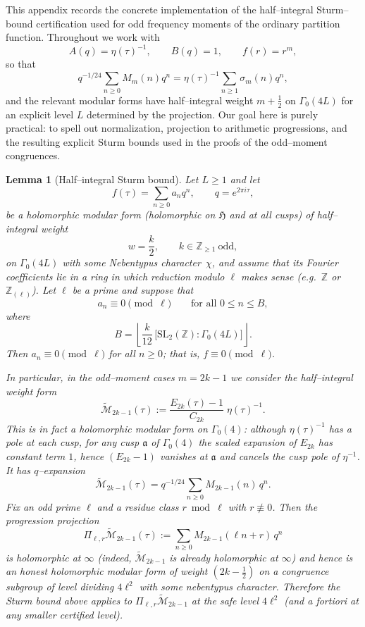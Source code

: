 \documentclass[11pt]{article}
\newtheorem{lemma}[theorem]{Lemma}
\theoremstyle{definition}
\theoremstyle{remark}
\begin{document}
This appendix records the concrete implementation of the half--integral
Sturm--bound certification used for odd frequency moments of the ordinary
partition function.  Throughout we work with
\[
A(q)=\eta(\tau)^{-1},\qquad B(q)=1,\qquad f(r)=r^m,
\]
so that
\[
  q^{-1/24}\sum_{n\ge0} M_m(n)q^n
  =\eta(\tau)^{-1}\sum_{n\ge1}\sigma_m(n)q^n,
\]
and the relevant modular forms have half--integral weight $m+\tfrac12$ on
$\Gamma_0(4L)$ for an explicit level $L$ determined by the projection.
Our goal here is purely practical: to spell out normalization,
projection to arithmetic progressions, and the resulting explicit
Sturm bounds used in the proofs of the odd--moment congruences.


\begin{lemma}[Half--integral Sturm bound]\label{lem:sturm-half}
Let $L\ge1$ and let
\[
f(\tau)=\sum_{n\ge0} a_n q^n,\qquad q=e^{2\pi i\tau},
\]
be a holomorphic modular form (holomorphic on $\mathfrak{H}$ and at all cusps)
of half--integral weight
\[
w=\frac{k}{2},\qquad k\in\mathbb{Z}_{\ge1}\ \text{odd},
\]
on $\Gamma_0(4L)$ with some Nebentypus character~$\chi$, and assume that its
Fourier coefficients lie in a ring in which reduction modulo $\ell$ makes sense
(e.g.\ $\mathbb{Z}$ or $\mathbb{Z}_{(\ell)}$).  Let $\ell$ be a prime and suppose that
\[
a_n \equiv 0 \pmod{\ell}\qquad\text{for all }0\le n\le B,
\]
where
\[
B
=\left\lfloor \frac{k}{12}\,
   \bigl[\mathrm{SL}_2(\mathbb{Z}):\Gamma_0(4L)\bigr]\right\rfloor.
\]
Then $a_n\equiv0\pmod{\ell}$ for all $n\ge0$; that is, $f\equiv0\pmod{\ell}$.

\medskip
In particular, in the odd--moment cases $m=2k-1$ we consider the half--integral
weight form
\[
\widetilde{\mathcal M}_{2k-1}(\tau)
:=\frac{E_{2k}(\tau)-1}{C_{2k}}\;\eta(\tau)^{-1}.
\]
This is in fact a \emph{holomorphic} modular form on $\Gamma_0(4)$: although
$\eta(\tau)^{-1}$ has a pole at each cusp, for any cusp $\mathfrak a$ of
$\Gamma_0(4)$ the scaled expansion of $E_{2k}$ has constant term $1$, hence
$(E_{2k}-1)$ vanishes at $\mathfrak a$ and cancels the cusp pole of $\eta^{-1}$.
It has $q$--expansion
\[
\widetilde{\mathcal M}_{2k-1}(\tau)=q^{-1/24}\sum_{n\ge0} M_{2k-1}(n)\,q^n.
\]
Fix an odd prime $\ell$ and a residue class $r\bmod \ell$ with $r\not\equiv 0$.
Then the progression projection
\[
\Pi_{\ell,r}\widetilde{\mathcal M}_{2k-1}(\tau)
:=\sum_{n\ge0} M_{2k-1}(\ell n+r)\,q^n
\]
is holomorphic at $\infty$ (indeed, $\widetilde{\mathcal M}_{2k-1}$ is already
holomorphic at $\infty$) and hence is an honest holomorphic modular form of
weight $(2k-\tfrac12)$ on a congruence subgroup of level dividing $4\ell^2$ with
some nebentypus character.  Therefore the Sturm bound above applies to
$\Pi_{\ell,r}\widetilde{\mathcal M}_{2k-1}$ at the safe level $4\ell^2$ (and a
fortiori at any smaller certified level).
\end{lemma}
\end{document}
